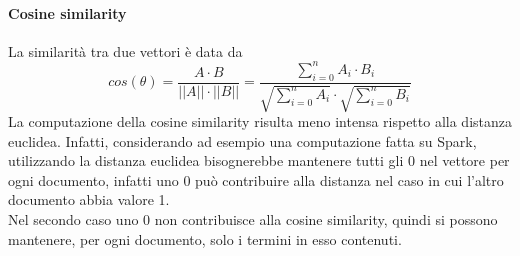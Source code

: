 \paragraph{Cosine similarity}
La similarità tra due vettori è data da
$$
    cos(\theta) = \frac{A \cdot B}{||A||  \cdot  ||B||} = 
    \frac{\sum_{i=0}^{n} A_i \cdot B_i}{\sqrt{\sum_{i=0}^{n} A_i}  \cdot  \sqrt{\sum_{i=0}^{n} B_i}}
$$
La computazione della cosine similarity risulta meno intensa rispetto alla distanza euclidea.
Infatti, considerando ad esempio una computazione fatta su Spark, utilizzando la 
distanza euclidea bisognerebbe mantenere tutti gli 0 nel vettore per ogni documento, infatti 
uno 0 può contribuire alla distanza nel caso in cui l'altro documento abbia valore 1. \\
Nel secondo 
caso uno 0 non contribuisce alla cosine similarity, quindi si possono mantenere, per ogni documento, 
solo i termini in esso contenuti.